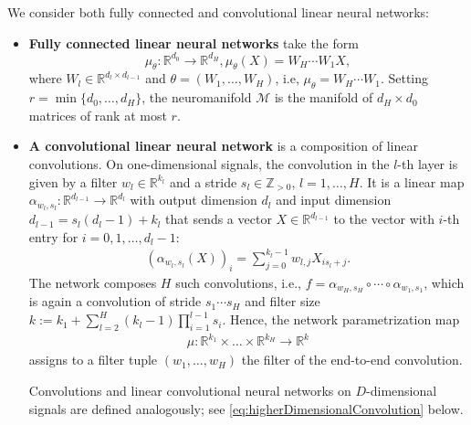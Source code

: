 \documentclass[twoside]{article}
\theoremstyle{definition}
\theoremstyle{remark}
\begin{document}
We consider both fully connected and convolutional linear neural networks:
\begin{itemize}
    \item \textbf{Fully connected linear neural networks} take the form 
    \[
    \mu_\theta : \mathbb{R}^{d_0} \to \mathbb{R}^{d_H}, \mu_\theta(X) = W_H\cdots W_1 X,
    \]
    where $W_l \in \mathbb{R}^{d_l \times d_{l-1}}$ and $\theta=(W_1,\hdots,W_H)$, i.e, $\mu_{\theta} = W_H \cdots W_1$. Setting $r = \min\{d_0,\hdots,d_H\}$, the neuromanifold $\mathcal{M}$ is the manifold of $d_H \times d_0$ matrices of rank at most $r$.
    \item \textbf{A convolutional linear neural network} is a composition of linear convolutions. On one-dimensional signals, the convolution in the 
    $l$-th layer is given by a filter $w_l \in \mathbb{R}^{k_l}$ and a stride $s_l \in \mathbb{Z}_{>0}$, $l=1,\hdots,H$.
    It is a linear map $\alpha_{w_l,s_l}: \mathbb{R}^{d_{l-1}} \to \mathbb{R}^{d_l}$ with output dimension $d_l$ and input dimension $d_{l-1} = s_l(d_l-1)+k_l$ that sends a vector $X \in \mathbb{R}^{d_{l-1}}$ to the vector with $i$-th entry for  $i = 0, 1, \ldots, d_l-1:$
    \begin{align}\label{def:conv-one-D} \textstyle
    \left(\alpha_{w_l,s_l}(X) \right)_i = \sum_{j=0}^{k_l-1} w_{l,j} X_{i s_l + j}.
    \end{align}
    The network composes $H$ such convolutions, i.e., $f = \alpha_{w_H,s_H} \circ \cdots \circ \alpha_{w_1,s_1}$, which is again a convolution of stride $s_1 \cdots s_H$ and filter size $k := k_1 + \sum_{l=2}^H (k_{l}-1) \prod_{i=1}^{l-1} s_i$.
    Hence,  the network parametrization map 
    \begin{align*}
    \mu: \mathbb{R}^{k_1} \times \ldots \times \mathbb{R}^{k_H} \to \mathbb{R}^k 
    \end{align*}
    assigns to a filter tuple $(w_1, \ldots, w_H)$ the filter of the end-to-end convolution.

    Convolutions and linear convolutional neural networks on $D$-dimensional signals are defined analogously; see \eqref{eq:higherDimensionalConvolution} below.
\end{itemize}
\end{document}
